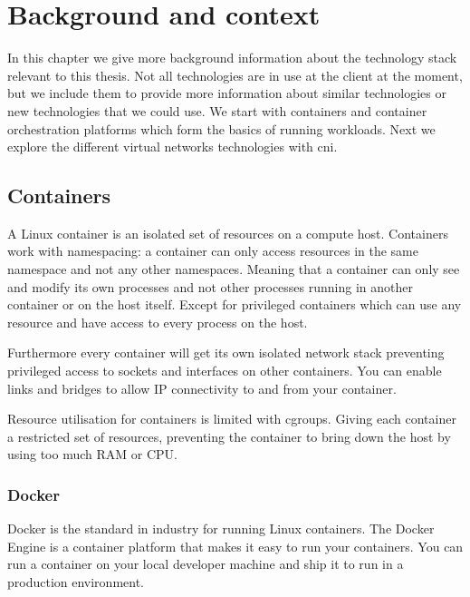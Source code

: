 \chapter{Background and context}

In this chapter we give more background information about the technology stack relevant to this thesis. Not all technologies are in use at the client at the moment, but we include them to provide more information about similar technologies or new technologies that we could use. We start with containers and container orchestration platforms which form the basics of running workloads. Next we explore the different virtual networks technologies with \gls{cni}.

\section{Containers}
A Linux container is an isolated set of resources on a compute host. Containers work with namespacing: a container can only access resources in the same namespace and not any other namespaces. Meaning that a container can only see and modify its own processes and not other processes running in another container or on the host itself. Except for privileged containers which can use any resource and have access to every process on the host. 

Furthermore every container will get its own isolated network stack preventing privileged access to sockets and interfaces on other containers. You can enable links and bridges to allow IP connectivity to and from your container.

Resource utilisation for containers is limited with \glspl{cgroup}. Giving each container a restricted set of resources, preventing the container to bring down the host by using too much RAM or CPU\cite{docker_security}.

\subsection{Docker}
Docker is the standard in industry for running Linux containers. The Docker Engine is a container platform that makes it easy to run your containers. You can run a container on your local developer machine and ship it to run in a production environment.

